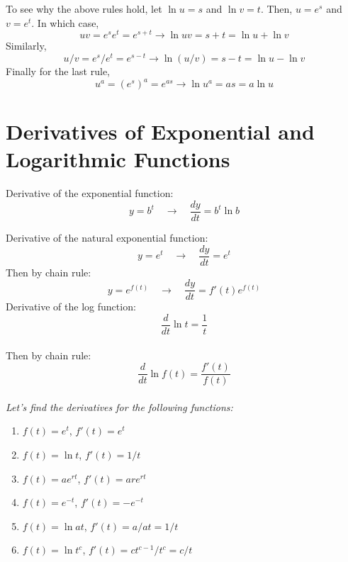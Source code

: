 \documentclass{./../Latex/handout}
\begin{document}
To see why the above rules hold, let $\ln u = s$ and $\ln v = t$. Then, $u=e^s$ and $v=e^t$. In which case,
\[ uv = e^s e^t = e^{s+t} \rightarrow \ln uv =s+t = \ln u + \ln v \]
Similarly, 
\[ u/v = e^s/e^t = e^{s-t} \rightarrow \ln (u/v) =s-t = \ln u - \ln v \]
Finally for the last rule, 
\[u^a = (e^s)^a=e^{as} \rightarrow \ln u^a = as = a\ln u \]

\section{Derivatives of Exponential and Logarithmic Functions}
Derivative of the exponential function:
\[ y=b^{t} \quad \rightarrow \quad \frac{dy}{dt} = b^t \ln b  \]

Derivative of the natural exponential function:
$$ y=e^t \quad \rightarrow \quad \frac{dy}{dt} = e^t $$
Then by chain rule:
 $$y=e^{f(t)} \quad \rightarrow \quad \frac{dy}{dt} = f'(t) e^{f(t)}$$
 Derivative of the log function:
 $$ \frac{d}{d t} \ln t =\frac{1}{t} $$ \\
 Then by chain rule:
 $$ \frac{d}{d t} \ln f(t) =\frac{f'(t)}{f(t)} $$ \\
 
\textit{Let's find the derivatives for the following functions:}
\begin{enumerate}
\item $f(t)=e^t$, $f'(t) = e^t$
\item $f(t)=\ln t$, $f'(t) = 1/t$
\item $f(t)=ae^{rt}$, $f'(t) = are^{rt}$
\item $f(t)=e^{-t}$, $f'(t) = -e^{-t}$
\item $f(t)=\ln a t$, $f'(t) = a/at = 1/t$
\item $f(t)=\ln t^{c}$, $f'(t) = ct^{c-1}/t^c = c/t$
\end{enumerate}
\end{document}
